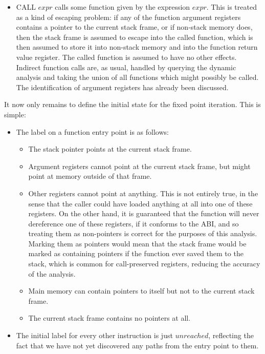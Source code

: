 \begin{itemize}
\item
  CALL $expr$ calls some function given by the expression $expr$.
  This is treated as a kind of escaping problem: if any of the
  function argument registers contains a pointer to the current stack
  frame, or if non-stack memory does, then the stack frame is assumed
  to escape into the called function, which is then assumed to store
  it into non-stack memory and into the function return value
  register.  The called function is assumed to have no other
  effects.  Indirect function calls
  are, as usual, handled by querying the dynamic analysis and taking
  the union of all functions which might possibly be called.  The
  identification of argument registers has already been discussed.
\end{itemize}

It now only remains to define the initial state for the fixed point
iteration.  This is simple:

\begin{itemize}
\item
  The label on a function entry point is as follows:

  \begin{itemize}
  \item The stack pointer points at the current stack frame.
  \item Argument registers cannot point at the current stack frame,
    but might point at memory outside of that frame.
  \item Other registers cannot point at anything.  This is not
    entirely true, in the sense that the caller could have loaded
    anything at all into one of these registers.  On the other hand,
    it is guaranteed that the function will never dereference one of
    these registers, if it conforms to the ABI, and so treating them
    as non-pointers is correct for the purposes of this analysis.
    Marking them as pointers would mean that the stack frame would be
    marked as containing pointers if the function ever saved them to
    the stack, which is common for call-preserved registers, reducing
    the accuracy of the analysis.
  \item Main memory can contain pointers to itself but not to the
    current stack frame.
  \item The current stack frame contains no pointers at all.
  \end{itemize}
\item
  The initial label for every other instruction is just $unreached$,
  reflecting the fact that we have not yet discovered any paths from
  the entry point to them.
\end{itemize}

